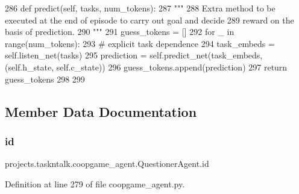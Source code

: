 \begin{DoxyCode}
286     \textcolor{keyword}{def }predict(self, tasks, num\_tokens):
287         \textcolor{stringliteral}{"""}
288 \textcolor{stringliteral}{        Extra method to be executed at the end of episode to carry out goal and decide}
289 \textcolor{stringliteral}{        reward on the basis of prediction.}
290 \textcolor{stringliteral}{        """}
291         guess\_tokens = []
292         \textcolor{keywordflow}{for} \_ \textcolor{keywordflow}{in} range(num\_tokens):
293             \textcolor{comment}{# explicit task dependence}
294             task\_embeds = self.listen\_net(tasks)
295             prediction = self.predict\_net(task\_embeds, (self.h\_state, self.c\_state))
296             guess\_tokens.append(prediction)
297         \textcolor{keywordflow}{return} guess\_tokens
298 
299 
\end{DoxyCode}


\subsection{Member Data Documentation}
\mbox{\label{classprojects_1_1taskntalk_1_1coopgame__agent_1_1QuestionerAgent_a485197cefeb040ec41e7a58ce2efe19c}} 
\subsubsection{\texorpdfstring{id}{id}}
{\footnotesize\ttfamily projects.\+taskntalk.\+coopgame\+\_\+agent.\+Questioner\+Agent.\+id}



Definition at line 279 of file coopgame\+\_\+agent.\+py.

\mbox{\label{classprojects_1_1taskntalk_1_1coopgame__agent_1_1QuestionerAgent_a91db82359e87c125039573ba9070eab3}} 
